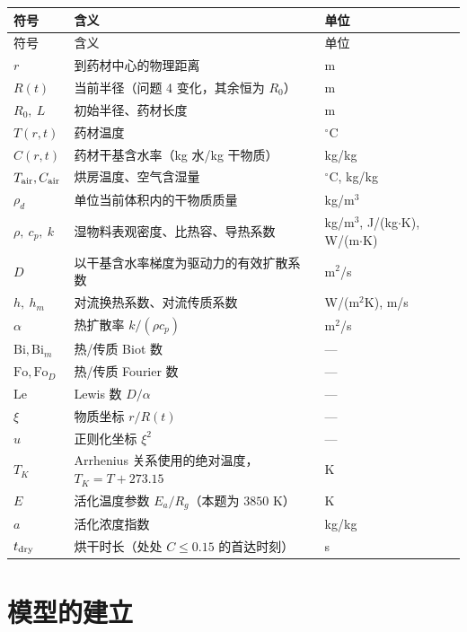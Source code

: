 \documentclass[bwprint]{cumcmthesis}
\begin{document}
\begin{center}
\small
\begin{longtable}{@{}p{2.5cm}p{8.4cm}p{3.5cm}@{}}
\toprule
符号 & 含义 & 单位 \\
\midrule
\endfirsthead
\toprule
符号 & 含义 & 单位 \\
\midrule
\endhead
$r$ & 到药材中心的物理距离 & m \\
$R(t)$ & 当前半径（问题 4 变化，其余恒为 $R_0$） & m \\
$R_0,\ L$ & 初始半径、药材长度 & m \\
$T(r,t)$ & 药材温度 & $^\circ$C \\
$C(r,t)$ & 药材干基含水率（kg 水/kg 干物质） & kg/kg \\
$T_{\rm air},C_{\rm air}$ & 烘房温度、空气含湿量 & $^\circ$C, kg/kg \\
$\rho_d$ & 单位当前体积内的干物质质量 & kg/m$^3$ \\
$\rho,\ c_p,\ k$ & 湿物料表观密度、比热容、导热系数 & kg/m$^3$, J/(kg$\cdot$K), W/(m$\cdot$K) \\
$D$ & 以干基含水率梯度为驱动力的有效扩散系数 & m$^2$/s \\
$h,\ h_m$ & 对流换热系数、对流传质系数 & W/(m$^2$K), m/s \\
$\alpha$ & 热扩散率 $k/(\rho c_p)$ & m$^2$/s \\
$\mathrm{Bi},\mathrm{Bi}_m$ & 热/传质 Biot 数 & --- \\
$\mathrm{Fo},\mathrm{Fo}_D$ & 热/传质 Fourier 数 & --- \\
$\mathrm{Le}$ & Lewis 数 $D/\alpha$ & --- \\
$\xi$ & 物质坐标 $r/R(t)$ & --- \\
$u$ & 正则化坐标 $\xi^2$ & --- \\
$T_K$ & Arrhenius 关系使用的绝对温度，$T_K=T+273.15$ & K \\
$E$ & 活化温度参数 $E_a/R_g$（本题为 $3850$ K） & K \\
$a$ & 活化浓度指数 & kg/kg \\
$t_{\rm dry}$ & 烘干时长（处处 $C\le0.15$ 的首达时刻） & s \\
\bottomrule
\end{longtable}
\end{center}
\setcounter{table}{0}   %

\section{模型的建立}
\end{document}

